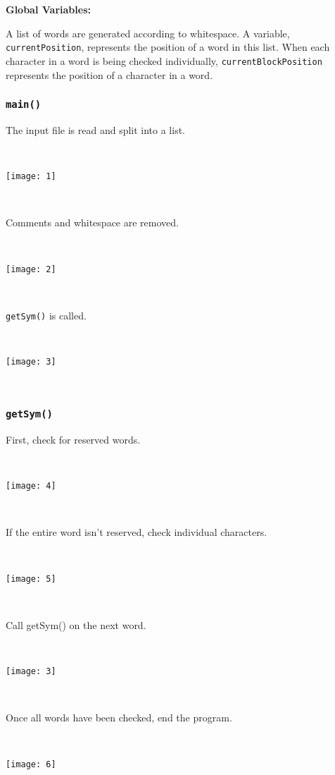\documentclass[11pt]{article}
\begin{document}
\bigskip
\textbf{Global Variables:}

\bigskip
A list of words are generated according to whitespace. A variable, {\tt currentPosition}, represents the position of a word in this list. When each character in a word is being checked individually, {\tt currentBlockPosition} represents the position of a character in a word.

\subsubsection{{\tt main()}}

The input file is read and split into a list.

~
\begin{center}
\texttt{[image: 1]}
\end{center}
~

Comments and whitespace are removed.

~
\begin{center}
\texttt{[image: 2]}
\end{center}
~

{\tt getSym()} is called.

~
\begin{center}
\texttt{[image: 3]}
\end{center}
~

\subsubsection{{\tt getSym()}}

First, check for reserved words.

~
\begin{center}
\texttt{[image: 4]}
\end{center}
~

If the entire word isn't reserved, check individual characters.

~
\begin{center}
\texttt{[image: 5]}
\end{center}
~

Call getSym() on the next word.

~
\begin{center}
\texttt{[image: 3]}
\end{center}
~

Once all words have been checked, end the program.

~
\begin{center}
\texttt{[image: 6]}
\end{center}
~
\end{document}
